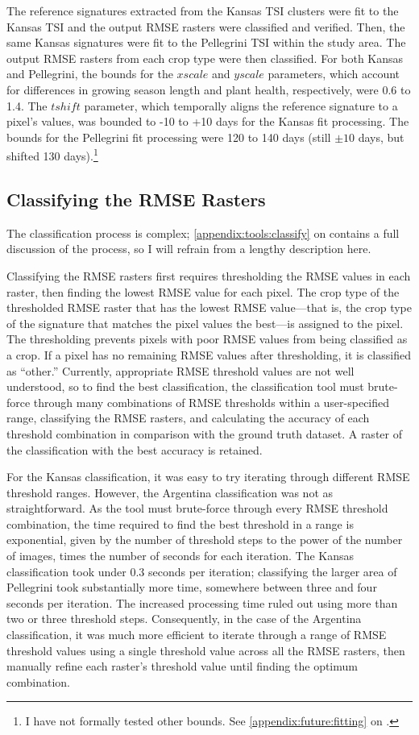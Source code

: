 The reference signatures extracted from the Kansas TSI clusters were fit to the Kansas TSI and the output RMSE rasters were classified and verified. Then, the same Kansas signatures were fit to the Pellegrini TSI within the study area. The output RMSE rasters from each crop type were then classified. For both Kansas and Pellegrini, the bounds for the $xscale$ and $yscale$ parameters, which account for differences in growing season length and plant health, respectively, were 0.6 to 1.4. The $tshift$ parameter, which temporally aligns the reference signature to a pixel's values, was bounded to -10 to +10 days for the Kansas fit processing. The bounds for the Pellegrini fit processing were 120 to 140 days (still $\pm10$ days, but shifted 130 days).\footnote{I have not formally tested other bounds. See \autoref{appendix:future:fitting} on .} 


\subsection{Classifying the RMSE Rasters}

The classification process is complex; \autoref{appendix:tools:classify} on  contains a full discussion of the process, so I will refrain from a lengthy description here.

Classifying the RMSE rasters first requires thresholding the RMSE values in each raster, then finding the lowest RMSE value for each pixel. The crop type of the thresholded RMSE raster that has the lowest RMSE value---that is, the crop type of the signature that matches the pixel values the best---is assigned to the pixel. The thresholding prevents pixels with poor RMSE values from being classified as a crop. If a pixel has no remaining RMSE values after thresholding, it is classified as ``other.'' Currently, appropriate RMSE threshold values are not well understood, so to find the best classification, the classification tool must brute-force through many combinations of RMSE thresholds within a user-specified range, classifying the RMSE rasters, and calculating the accuracy of each threshold combination in comparison with the ground truth dataset. A raster of the classification with the best accuracy is retained.

For the Kansas classification, it was easy to try iterating through different RMSE threshold ranges. However, the Argentina classification was not as straightforward. As the tool must brute-force through every RMSE threshold combination, the time required to find the best threshold in a range is exponential, given by the number of threshold steps to the power of the number of images, times the number of seconds for each iteration. The Kansas classification took under 0.3 seconds per iteration; classifying the larger area of Pellegrini took substantially more time, somewhere between three and four seconds per iteration. The increased processing time ruled out using more than two or three threshold steps. Consequently, in the case of the Argentina classification, it was much more efficient to iterate through a range of RMSE threshold values using a single threshold value across all the RMSE rasters, then manually refine each raster's threshold value until finding the optimum combination.